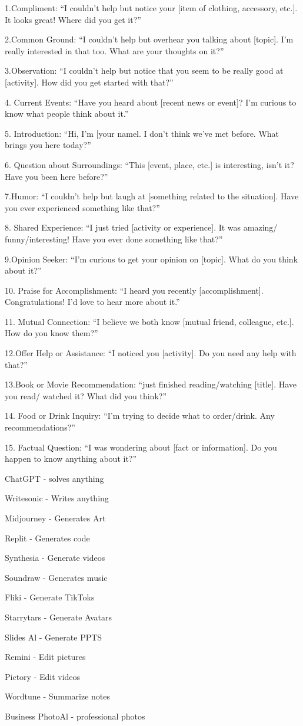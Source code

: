 \documentclass{article}  %
\begin{document}
1.Compliment:
“I couldn’t help but notice your [item of clothing, accessory, etc.]. It looks great! Where did you get it?”

2.Common Ground:
“I couldn’t help but overhear you talking about [topic]. I’m really interested in that too. What are your thoughts on it?”

3.Observation:
“I couldn’t help but notice that you seem to be really good at [activity]. How did you get started with that?”

4. Current Events:
“Have you heard about [recent news or event]? I’m curious to know what people think about it.”

5. Introduction:
“Hi, I’m [your namel. I don’t think we’ve met before. What brings you here today?”

6. Question about Surroundings:
“This [event, place, etc.] is interesting, isn’t it? Have you been here before?”

7.Humor:
“I couldn’t help but laugh at [something related to the situation]. Have you ever experienced something like that?”

8. Shared Experience:
“I just tried [activity or experience]. It was amazing/ funny/interesting! Have you ever done something like that?”

9.Opinion Seeker:
“I’m curious to get your opinion on [topic]. What do you think about it?”

10. Praise for Accomplishment:
“I heard you recently [accomplishment]. Congratulations! I’d love to hear more about it.”

11. Mutual Connection:
“I believe we both know [mutual friend, colleague, etc.]. How do you know them?”

12.Offer Help or Assistance:
“I noticed you [activity]. Do you need any help with that?”

13.Book or Movie Recommendation:
“just finished reading/watching [title]. Have you read/ watched it? What did you think?”

14. Food or Drink Inquiry:
“I’m trying to decide what to order/drink. Any recommendations?”

15. Factual Question:
“I was wondering about [fact or information]. Do you happen to know anything about it?”

ChatGPT - solves anything

Writesonic - Writes anything

Midjourney - Generates Art

Replit - Generates code

Synthesia - Generate videos

Soundraw - Generates music

Fliki - Generate TikToks

Starrytars - Generate Avatars

Slides Al - Generate PPTS

Remini - Edit pictures

Pictory - Edit videos

Wordtune - Summarize notes

Business PhotoAl - professional photos
\end{document}
